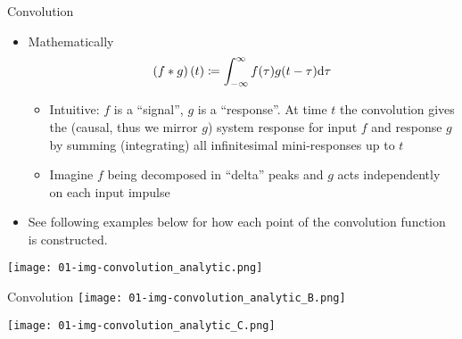   \begin{frame}{Convolution}
    \begin{itemize}
      \item Mathematically
        \begin{equation*}
          \left(f * g\right)(t) \coloneqq
            \int_{-\infty}^\infty f(\tau)g(t-\tau)\mathrm{d}\tau
        \end{equation*}
      \begin{itemize}
        \item Intuitive: $f$ is a \enquote{signal}, $g$ is a \enquote{response}.
          At time $t$ the convolution gives the (causal, thus we mirror $g$)
          system response for input $f$ and response $g$ by summing (integrating)
          all infinitesimal mini-responses up to $t$
          \item Imagine $f$ being decomposed in \enquote{delta} peaks and $g$
            acts independently on each input impulse
      \end{itemize}
      \item See following examples below for how each point of the convolution function is constructed.
    \end{itemize}

    \texttt{[image: 01-img-convolution\_analytic.png]}
  \end{frame}
  \begin{frame}{Convolution}
    \texttt{[image: 01-img-convolution\_analytic\_B.png]}

    \texttt{[image: 01-img-convolution\_analytic\_C.png]}
  \end{frame}

